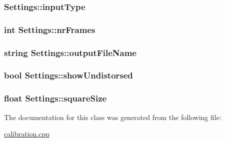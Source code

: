 \label{classSettings_abd5706146b34d3c32aef4025dcd2ec1b}
\hypertarget{classSettings_a89fb14ce9856fb642f18bb0f7c5b8868}{
\subsubsection[{inputType}]{ {\bf Settings::inputType}}}
\label{classSettings_a89fb14ce9856fb642f18bb0f7c5b8868}
\hypertarget{classSettings_a7e6654cd0e51791ed687eaa85f8fc143}{
\subsubsection[{nrFrames}]{\setlength{\rightskip}{0pt plus 5cm}int {\bf Settings::nrFrames}}}
\label{classSettings_a7e6654cd0e51791ed687eaa85f8fc143}
\hypertarget{classSettings_a9468f1ad53e982f9541d76c8d3228900}{
\subsubsection[{outputFileName}]{\setlength{\rightskip}{0pt plus 5cm}string {\bf Settings::outputFileName}}}
\label{classSettings_a9468f1ad53e982f9541d76c8d3228900}
\hypertarget{classSettings_a935d6f27ee454e9fee63f8b662f48a06}{
\subsubsection[{showUndistorsed}]{\setlength{\rightskip}{0pt plus 5cm}bool {\bf Settings::showUndistorsed}}}
\label{classSettings_a935d6f27ee454e9fee63f8b662f48a06}
\hypertarget{classSettings_a6c94708776ad1ce258fc44f2101f5941}{
\subsubsection[{squareSize}]{\setlength{\rightskip}{0pt plus 5cm}float {\bf Settings::squareSize}}}
\label{classSettings_a6c94708776ad1ce258fc44f2101f5941}


The documentation for this class was generated from the following file:\begin{DoxyCompactItemize}
\item 
\hyperlink{calibration_8cpp}{calibration.cpp}\end{DoxyCompactItemize}
